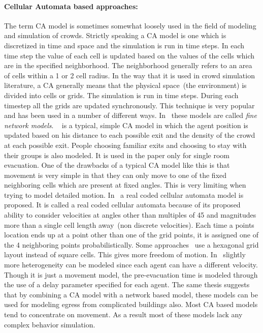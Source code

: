 \paragraph{Cellular Automata based approaches:}
 The term CA model is sometimes somewhat loosely used in the field of modeling and simulation of crowds. Strictly speaking a CA model is one which is discretized in time and space and the simulation is run in time steps. In each time step the value of each cell is updated based on the values of the cells which are in the specified neighborhood. The neighborhood generally refers to an area of cells within a 1 or 2 cell radius. In the way that it is used in crowd simulation literature, a CA generally means that the physical space~(the environment) is divided into cells or grids. The simulation is run in time steps. During each timestep all the grids are updated synchronously. This technique is very popular and has been used in a number of different ways. In~\cite{Gwynne:1999vi,Kuligowski:2005tt} these models are called \emph{fine network models}.
~\cite{Yuan:2007ja} is a typical, simple CA model in which the agent position is updated based on his distance to each possible exit and the density of the crowd at each possible exit. People choosing familiar exits and choosing to stay with their groups is also modeled. It is used in the paper only for single room evacuation.
One of the drawbacks of a typical CA model like this is that movement is very simple in that they can only move to one of the fixed neighboring cells which are present at fixed angles. This is very limiting when trying to model detailed motion. In~\cite{Yamamoto:2007dc} a real coded cellular automata model is proposed. It is called a real coded cellular automata because of its proposed ability to consider velocities at angles other than multiples of 45 and magnitudes more than a single cell length away~(non discrete velocities). Each time a points location ends up at a point other than one of the grid points, it is assigned one of the 4 neighboring points probabilistically. Some approaches~\cite{Klein:2009} use a hexagonal grid layout instead of square cells. This gives more freedom of motion.
In~\cite{Klupfel:2003wa} slightly more heterogeneity can be modeled since each agent can have a different velocity. Though it is just a movement model, the pre-evacuation time is modeled through the use of a delay parameter specified for each agent. The same thesis suggests that by combining a CA model with a network based model, these models can be used for modeling egress from complicated buildings also.
Most CA based models tend to concentrate on movement. As a result most of these models lack any complex behavior simulation.


